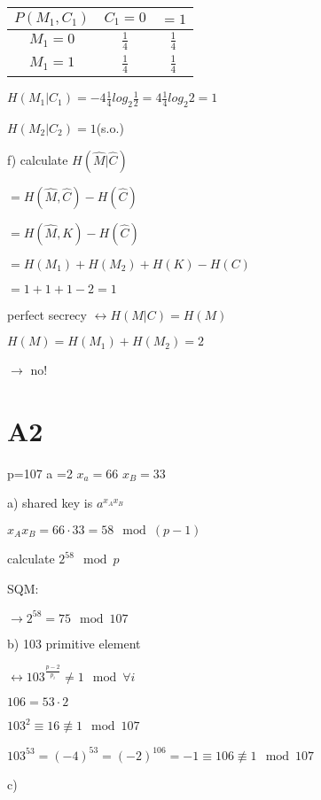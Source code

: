 \documentclass[a4paper]{article}
\begin{document}
\begin{table}
	\centering
	\begin{tabular}{c|cc}
		$P(M_1,C_1)$ & $C_1 = 0$ & $=1$ \\

		\hline

		$M_1 = 0$ & $\frac{1}{4}$ & $\frac{1}{4}$ \\

		$M_1 = 1$ & $\frac{1}{4}$ & $\frac{1}{4}$ \\

	\end{tabular}
\end{table}

$H(M_1|C_1)=-4 \frac{1}{4} log_2 \frac{1}{2} =4 \frac{1}{4} log_2 2 = 1$

$H(M_2|C_2)=1$(s.o.)


f) calculate $H(\hat M|\hat C)$

$=H(\hat M,\hat C)-H(\hat C)$

$=H(\hat M,K) - H(\hat C)$

$=H(M_1)+H(M_2)+H(K)-H(C)$

$=1+1+1-2=1$

perfect secrecy $\leftrightarrow H(M|C) = H(M)$

$H(M) = H(M_1) +H(M_2) = 2$

$\rightarrow$ no!




\section{A2} 

p=107 a =2 $x_a=66$ $x_B = 33$

a) shared key is $a^{x_Ax_B}$

$x_Ax_B=66\cdot 33 = 58 \mod (p-1)$

calculate $2^{58} \mod p$

SQM:

$\rightarrow 2^{58} = 75 \mod 107$

b) 103 primitive element

$\leftrightarrow 103^{\frac{p-2}{p_i}}\neq 1 \mod \forall i$

$106 =53 \cdot 2$

$103^2 \equiv 16 \nequiv 1 \mod 107$

$103^{53} = (-4)^{53} = (-2)^{106} = -1 \equiv 106 \nequiv 1 \mod 107$

c)
\end{document}
